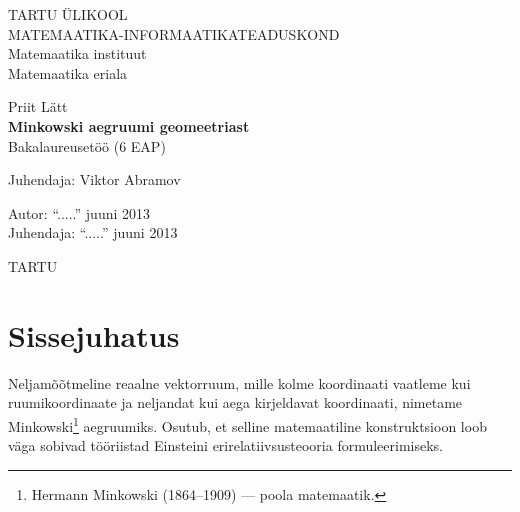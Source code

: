 \documentclass[12pt,a4paper,oneside]{article}
\theoremstyle{plain}
\theoremstyle{definition}
\numberwithin{equation}{section}
\def\title{Minkowski aegruumi geomeetriast}
\def\author{Priit Lätt}
\begin{document}

\begin{titlepage}
\begin{center}

{\large TARTU ÜLIKOOL}\\[0.3cm]
{\large MATEMAATIKA-INFORMAATIKATEADUSKOND}\\[0.3cm]
{\large Matemaatika instituut}\\[0.3cm]
{\large Matemaatika eriala} %

\vfill
{\large \author}\\[0.3cm]
{\huge \textbf{\title}}\\[0.3cm]
{\large Bakalaureusetöö (6 EAP)} %

\vfill

\begin{flushright}
{\large Juhendaja: Viktor Abramov}
\end{flushright}

\vfill

\begin{flushleft}
{\large
Autor: \dotfill ``.....'' juuni 2013\\
Juhendaja: \dotfill ``.....'' juuni 2013
}
\end{flushleft}

\vfill

{\large TARTU \the\year}

\end{center}
\end{titlepage}

\tableofcontents

\newpage
\section*{Sissejuhatus}

Neljamõõtmeline reaalne vektorruum, mille kolme koordinaati 
vaatleme kui ruumi\-koordinaate ja neljandat kui aega kirjeldavat 
koordinaati, nimetame Minkowski\footnote{Hermann Minkowski 
(1864--1909) --- poola matemaatik.} aegruumiks. Osutub, et 
selline matemaatiline konstruktsioon loob väga sobivad 
tööriistad Einsteini erirelatiivsusteooria formuleerimiseks.
\end{document}
